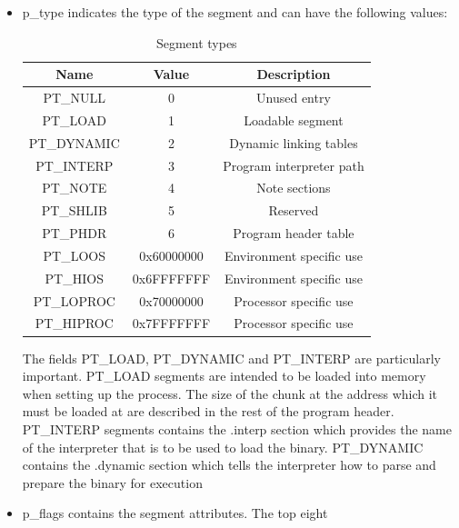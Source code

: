 \documentclass[paper=a4, fontsize=11pt]{report} %
\numberwithin{equation}{section} %
\numberwithin{figure}{section} %
\numberwithin{table}{section} %
\begin{document}
\begin{itemize}
	\item {\ttfamily p\_type} indicates the type of the segment and can have 
	the following values:
  \begin{table}[!htbp]
		\begin{center}
			\begin{tabular}{|c|c|c|}
				\hline
				\textbf{Name} & \textbf{Value} & \textbf{Description}\\ 
				\hline
				{\ttfamily PT\_NULL} & 0 & Unused entry\\ \hline
				{\ttfamily PT\_LOAD} & 1 & Loadable segment\\ \hline
				{\ttfamily PT\_DYNAMIC} & 2 & Dynamic linking tables\\ \hline
				{\ttfamily PT\_INTERP} & 3 & Program interpreter path\\ \hline
				{\ttfamily PT\_NOTE} & 4 & Note sections\\ \hline
				{\ttfamily PT\_SHLIB} & 5 & Reserved\\ \hline
				{\ttfamily PT\_PHDR} & 6 & Program header table\\ \hline
				{\ttfamily PT\_LOOS} & 0x60000000 & Environment specific use\\ 
				\hline
				{\ttfamily PT\_HIOS} & 0x6FFFFFFF & Environment specific use\\ 
				\hline
				{\ttfamily PT\_LOPROC} & 0x70000000 & Processor specific use\\ 
				\hline
				{\ttfamily PT\_HIPROC} & 0x7FFFFFFF & Processor specific use\\ 
				\hline
			\end{tabular}
			\caption{Segment types}
			\label{segtypes}
		\end{center}
	\end{table}
	The fields {\ttfamily PT\_LOAD}, {\ttfamily PT\_DYNAMIC} and {\ttfamily
	PT\_INTERP} are particularly important.
	{\ttfamily PT\_LOAD} segments are intended to be loaded into memory when 
	setting up the process. The size of the chunk at the address which it must 
	be loaded at are described in the rest of the program header.
	{\ttfamily PT\_INTERP} segments contains the {\ttfamily .interp} section 
	which provides the name of the interpreter that is to be used to load the 
	binary.
	{\ttfamily PT\_DYNAMIC} contains the {\ttfamily .dynamic} section which 
	tells the interpreter how to parse and prepare the binary for execution
	\item {\ttfamily p\_flags} contains the segment attributes. The top eight 

\end{itemize}
\end{document}

